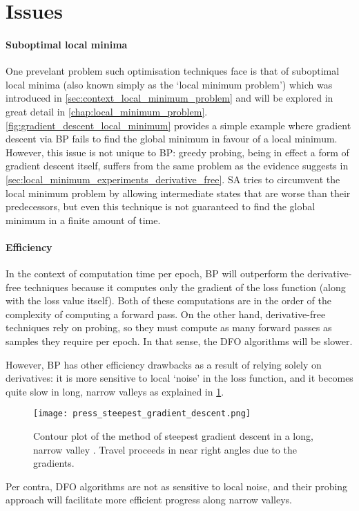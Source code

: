\section{Issues}
\label{sec:neural_training_issues}
\paragraph{Suboptimal local minima}
One prevelant problem such optimisation techniques face is that of suboptimal local minima (also known simply as the `local minimum problem') which was introduced in \ref{sec:context_local_minimum_problem} and will be explored in great detail in \ref{chap:local_minimum_problem}.
\ref{fig:gradient_descent_local_minimum} provides a simple example where gradient descent via BP fails to find the global minimum in favour of a local minimum.
However, this issue is not unique to BP: greedy probing, being in effect a form of gradient descent itself, suffers from the same problem as the evidence suggests in \ref{sec:local_minimum_experiments_derivative_free}.
SA tries to circumvent the local minimum problem by allowing intermediate states that are worse than their predecessors, but even this technique is not guaranteed to find the global minimum in a finite amount of time.

\paragraph{Efficiency}
In the context of computation time per epoch, BP will outperform the derivative-free techniques because it computes only the gradient of the loss function (along with the loss value itself). 
Both of these computations are in the order of the complexity of computing a forward pass.
On the other hand, derivative-free techniques rely on probing, so they must compute as many forward passes as samples they require per epoch.
In that sense, the DFO algorithms will be slower.

However, BP has other efficiency drawbacks as a result of relying solely on derivatives: it is more sensitive to local `noise' in the loss function, and it becomes quite slow in long, narrow valleys \cite{press1992} as explained in \ref{fig:gradient_descent_narrow_valley}.
\begin{figure}
    \texttt{[image: press\_steepest\_gradient\_descent.png]}
    \caption{Contour plot of the method of steepest gradient descent in a long, narrow valley \cite[421]{press1992}. Travel proceeds in near right angles due to the gradients.}
    \label{fig:gradient_descent_narrow_valley}
\end{figure}
Per contra, DFO algorithms are not as sensitive to local noise, and their probing approach will facilitate more efficient progress along narrow valleys.


